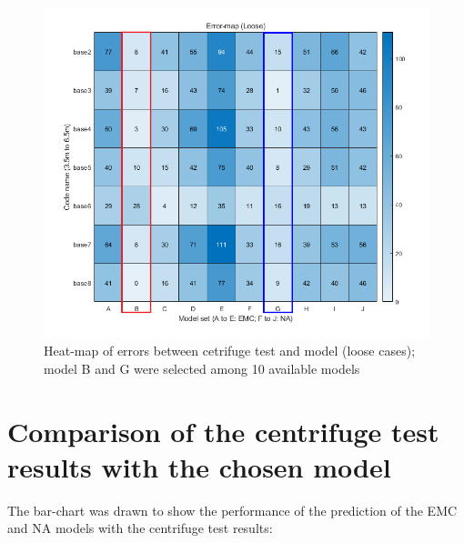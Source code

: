 \documentclass[a4paper, nobind]{templates/ociamthesis}
\begin{document}
\begin{figure}[H]
\includegraphics[width=1\linewidth]{myfigureeeeee/errormap_emc2} \caption{Heat-map of errors between cetrifuge test and model (loose cases); model B and G were selected among 10 available models}\label{fig:unnamed-chunk-46}
\end{figure}

\hypertarget{comparison-of-the-centrifuge-test-results-with-the-chosen-model}{%
\section{Comparison of the centrifuge test results with the chosen model}\label{comparison-of-the-centrifuge-test-results-with-the-chosen-model}}

The bar-chart was drawn to show the performance of the prediction of the EMC and NA models with the centrifuge test results:
\end{document}
